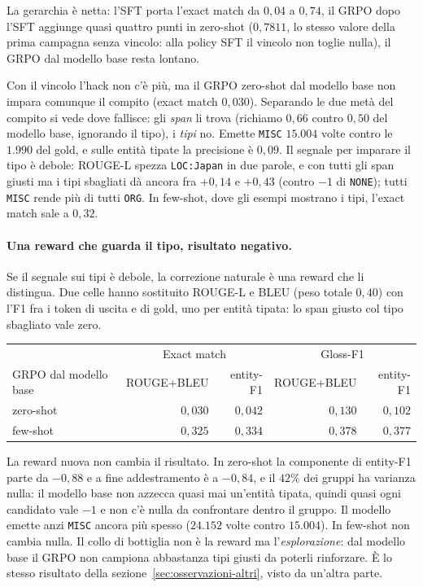 La gerarchia è netta: l'SFT porta l'exact match da $0{,}04$ a $0{,}74$, il GRPO
dopo l'SFT aggiunge quasi quattro punti in zero-shot ($0{,}7811$, lo stesso
valore della prima campagna senza vincolo: alla policy SFT il vincolo non
toglie nulla), il GRPO dal modello base resta lontano.

Con il vincolo l'hack non c'è più, ma il GRPO zero-shot dal modello base non
impara comunque il compito (exact match $0{,}030$). Separando le due metà del
compito si vede dove fallisce: gli \emph{span} li trova (richiamo $0{,}66$
contro $0{,}50$ del modello base, ignorando il tipo), i \emph{tipi} no. Emette
\texttt{MISC} $15.004$ volte contro le $1.990$ del gold, e sulle entità tipate
la precisione è $0{,}09$. Il segnale per imparare il tipo è debole: ROUGE-L
spezza \texttt{LOC:Japan} in due parole, e con tutti gli span giusti ma i tipi
sbagliati dà ancora fra $+0{,}14$ e $+0{,}43$ (contro $-1$ di \texttt{NONE});
tutti \texttt{MISC} rende più di tutti \texttt{ORG}. In few-shot, dove gli
esempi mostrano i tipi, l'exact match sale a $0{,}32$.

\paragraph{Una reward che guarda il tipo, risultato negativo.} Se il segnale
sui tipi è debole, la correzione naturale è una reward che li distingua. Due
celle hanno sostituito ROUGE-L e BLEU (peso totale $0{,}40$) con l'F1 fra i
token di uscita e di gold, uno per entità tipata: lo span giusto col tipo
sbagliato vale zero.

\begin{center}
\small
\begin{tabular}{lrrrr}
\toprule
 & \multicolumn{2}{c}{Exact match} & \multicolumn{2}{c}{Gloss-F1} \\
GRPO dal modello base & ROUGE+BLEU & entity-F1 & ROUGE+BLEU & entity-F1 \\
\midrule
zero-shot & $0{,}030$ & $0{,}042$ & $0{,}130$ & $0{,}102$ \\
few-shot  & $0{,}325$ & $0{,}334$ & $0{,}378$ & $0{,}377$ \\
\bottomrule
\end{tabular}
\end{center}

La reward nuova non cambia il risultato. In zero-shot la componente di
entity-F1 parte da $-0{,}88$ e a fine addestramento è a $-0{,}84$, e il $42\%$
dei gruppi ha varianza nulla: il modello base non azzecca quasi mai
un'entità tipata, quindi quasi ogni candidato vale $-1$ e non c'è nulla da
confrontare dentro il gruppo. Il modello emette anzi \texttt{MISC} ancora più
spesso ($24.152$ volte contro $15.004$). In few-shot non cambia nulla. Il
collo di bottiglia non è la reward ma l'\emph{esplorazione}: dal modello base il
GRPO non campiona abbastanza tipi giusti da poterli rinforzare. È lo stesso
risultato della sezione~\ref{sec:osservazioni-altri}, visto da un'altra parte.

